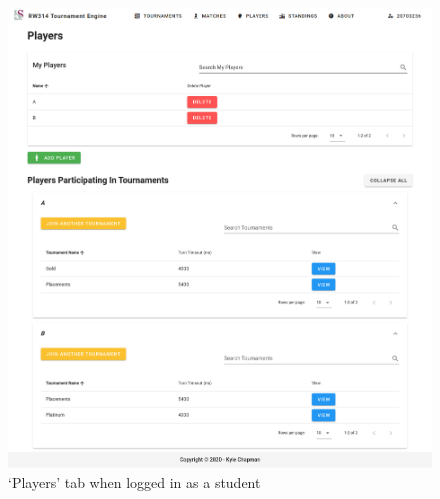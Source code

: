\documentclass[a4paper, 12pt]{report}
\begin{document}
\begin{figure}[H]
	\centering
	\includegraphics[scale=0.37]{players-student.png}
	\caption{`Players' tab when logged in as a student}
	\label{fig:players-student}
\end{figure}
\end{document}
